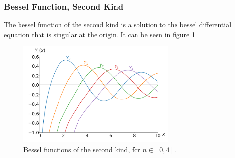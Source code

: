 \subsubsection{Bessel Function, Second Kind}
The bessel function of the second kind is a solution to
the bessel differential equation that is singular at the
origin. It can be seen in figure \ref{fig:Ynplot}.\cite{weisstein_bessel_second_kind}

\begin{figure}[h]
    \centering
    \includegraphics[width=0.7\textwidth]{figs/Ynplot.png}
    \caption{Bessel functions of the second kind, for $n\in[0,4]$.}
    \label{fig:Ynplot}
\end{figure}

